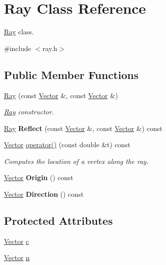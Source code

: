 \hypertarget{class_ray}{
\section{\-Ray \-Class \-Reference}
\label{class_ray}
}


\hyperlink{class_ray}{\-Ray} class.  




{\ttfamily \#include $<$ray.\-h$>$}

\subsection*{\-Public \-Member \-Functions}
\begin{DoxyCompactItemize}
\item 
\hyperlink{class_ray_ac042e01bad2bc40d7b82782d606d73bc}{\-Ray} (const \hyperlink{class_vector}{\-Vector} \&, const \hyperlink{class_vector}{\-Vector} \&)
\begin{DoxyCompactList}\small\item\em \hyperlink{class_ray}{\-Ray} constructor. \end{DoxyCompactList}\item 
\hypertarget{class_ray_ac7370340c4d068b895e96197affbdd55}{
\hyperlink{class_ray}{\-Ray} {\bfseries \-Reflect} (const \hyperlink{class_vector}{\-Vector} \&, const \hyperlink{class_vector}{\-Vector} \&) const }
\label{class_ray_ac7370340c4d068b895e96197affbdd55}

\item 
\hyperlink{class_vector}{\-Vector} \hyperlink{class_ray_a001ec0c1257895bfd10cd707f17b10b7}{operator()} (const double \&t) const 
\begin{DoxyCompactList}\small\item\em \-Computes the location of a vertex along the ray. \end{DoxyCompactList}\item 
\hypertarget{class_ray_a1f64bed4515cb96aadbe4d0e5f86458f}{
\hyperlink{class_vector}{\-Vector} {\bfseries \-Origin} () const }
\label{class_ray_a1f64bed4515cb96aadbe4d0e5f86458f}

\item 
\hypertarget{class_ray_a03b73a4709636a9a2c526c569265f84e}{
\hyperlink{class_vector}{\-Vector} {\bfseries \-Direction} () const }
\label{class_ray_a03b73a4709636a9a2c526c569265f84e}

\end{DoxyCompactItemize}
\subsection*{\-Protected \-Attributes}
\begin{DoxyCompactItemize}
\item 
\hyperlink{class_vector}{\-Vector} \hyperlink{class_ray_a2e41a40406edbbb3103ca0734a435c08}{c}
\item 
\hyperlink{class_vector}{\-Vector} \hyperlink{class_ray_a70e0d3a943faf00a399e432c386fd146}{n}
\end{DoxyCompactItemize}


